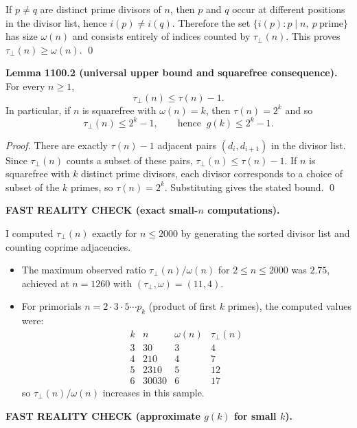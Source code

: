 If $p\ne q$ are distinct prime divisors of $n$, then $p$ and $q$ occur at different positions in the divisor list, hence $i(p)\ne i(q)$. Therefore the set $\{i(p): p\mid n,\ p\ \text{prime}\}$ has size $\omega(n)$ and consists entirely of indices counted by $\tau_\perp(n)$. This proves $\tau_\perp(n)\ge \omega(n)$. \qed

\smallskip
\noindent\textbf{Lemma 1100.2 (universal upper bound and squarefree consequence).}
For every $n\ge 1$,
\[
\tau_\perp(n)\le \tau(n)-1.
\]
In particular, if $n$ is squarefree with $\omega(n)=k$, then $\tau(n)=2^k$ and so
\[
\tau_\perp(n)\le 2^k-1,\qquad\text{hence }\ g(k)\le 2^k-1.
\]

\smallskip
\noindent\emph{Proof.}
There are exactly $\tau(n)-1$ adjacent pairs $(d_i,d_{i+1})$ in the divisor list. Since $\tau_\perp(n)$ counts a subset of these pairs, $\tau_\perp(n)\le \tau(n)-1$.
If $n$ is squarefree with $k$ distinct prime divisors, each divisor corresponds to a choice of subset of the $k$ primes, so $\tau(n)=2^k$. Substituting gives the stated bound. \qed

\smallskip
\noindent\textbf{FAST REALITY CHECK (exact small-$n$ computations).}

\smallskip
\noindent
I computed $\tau_\perp(n)$ exactly for $n\le 2000$ by generating the sorted divisor list and counting coprime adjacencies.
\begin{itemize}
\item The maximum observed ratio $\tau_\perp(n)/\omega(n)$ for $2\le n\le 2000$ was $2.75$, achieved at $n=1260$ with $(\tau_\perp,\omega)=(11,4)$.
\item For primorials $n=2\cdot3\cdot5\cdots p_k$ (product of first $k$ primes), the computed values were:
\[
\begin{array}{r|r|r|r}
 k & n & \omega(n) & \tau_\perp(n) \\\hline
 3&30&3&4\\
 4&210&4&7\\
 5&2310&5&12\\
 6&30030&6&17
\end{array}
\]
so $\tau_\perp(n)/\omega(n)$ increases in this sample.
\end{itemize}

\smallskip
\noindent\textbf{FAST REALITY CHECK (approximate $g(k)$ for small $k$).}

